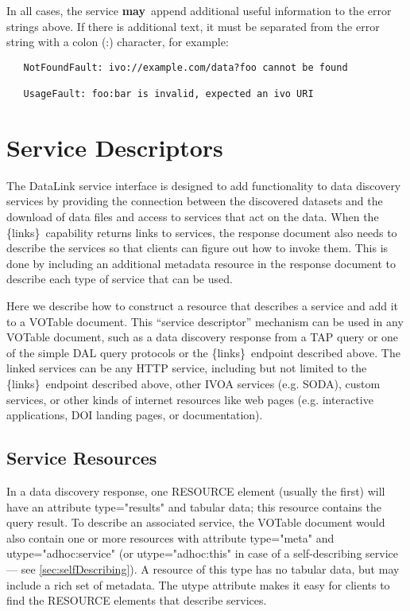 \documentclass[11pt,a4paper]{ivoa}
\newcommand{\blinks}{\{links\}}
\newcommand{\attval}[2]{#1={\allowbreak}{"}#2{"}}
\newcommand{\rfcmay}{\textbf{may}}
\begin{document}
In all cases, the service \rfcmay\ append additional useful information to the
error strings above.
If there is additional text, it must be separated
from the error string with a colon (:) character, for example:
\begin{verbatim}
   NotFoundFault: ivo://example.com/data?foo cannot be found

   UsageFault: foo:bar is invalid, expected an ivo URI
\end{verbatim}


\section{Service Descriptors}
\label{sec:serviceDescriptors}

The DataLink service interface is designed to add functionality to data
discovery services by providing the connection between the discovered
datasets and the download of data files and access to services that act
on the data. When the \blinks\ capability returns links to services, the
response document also needs to describe the services so that clients can
figure out how to invoke them. This is done by including an additional
metadata resource in the response document to describe each type of
service that can be used.

Here we describe how to construct a resource that describes a service
and add it to a VOTable document. This ``service descriptor'' mechanism can
be used in any VOTable document, such as a data discovery response from a TAP query
or one of the simple DAL query protocols or the \blinks\ endpoint described above.
The linked services can be any HTTP service, including but not limited to the \blinks\
endpoint described above, other IVOA services (e.g. SODA), custom services, or other
kinds of internet resources like web pages (e.g. interactive applications, DOI landing
pages, or documentation).

\subsection{Service Resources}
\label{sec:serviceResources}

In a data discovery response, one RESOURCE element (usually the first)
will have an attribute \attval{type}{results} and tabular data; this resource
contains the query result. To describe an associated service, the VOTable document
would also contain one or more resources with attribute \attval{type}{meta} and
\attval{utype}{adhoc:service}  (or \attval{utype}{adhoc:this} in case of
a self-describing service --- see \ref{sec:selfDescribing}). A resource of this
type has no tabular data, but may include a rich set of metadata. The utype attribute
makes it easy for clients to find the RESOURCE elements that describe services.
\end{document}
